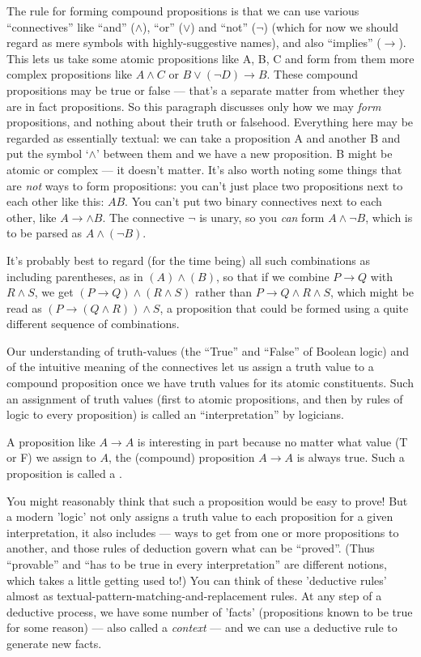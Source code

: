 The rule for forming compound propositions is that we can use various ``connectives'' like ``and'' ($\wedge$), ``or'' ($\vee$) and ``not'' ($\neg$) (which for now we should regard as mere symbols with highly-suggestive names), and also ``implies'' ($\to$). This lets us take some atomic propositions like A, B, C and form from them more complex propositions like $A \wedge C$ or $B\vee (\neg D) \to B$. These compound propositions may be true or false --- that's a separate matter from whether they are in fact propositions. So this paragraph discusses only how we may \textit{form} propositions, and nothing about their truth or falsehood. Everything here may be regarded as essentially textual: we can take a proposition A and another B and put the symbol `$\wedge$' between them and we have a new proposition. B might be atomic or complex --- it doesn't matter. It's also worth noting some things that are \textit{not} ways to form propositions: you can't just place two propositions next to each other like this: $AB$. You can't put two binary connectives next to each other, like $A \to \wedge B$. The connective $\neg$ is unary, so you \textit{can} form $A \wedge \neg B$, which is to be parsed as $A \wedge (\neg B)$.

It's probably best to regard (for the time being) all such combinations as including parentheses, as in $(A) \wedge (B)$, so that if we combine $P \to Q$ with $R  \wedge S$, we get $(P \to Q) \wedge (R  \wedge S)$ rather than $P \to Q  \wedge R \wedge S$, which might be read as $(P  \to (Q  \wedge R)) \wedge S$, a proposition that could be formed using a quite different sequence of combinations.  

Our understanding of truth-values (the ``True'' and ``False'' of Boolean logic) and of the intuitive meaning of the connectives let us assign a truth value to a compound proposition once we have truth values for its atomic constituents. Such an assignment of truth values (first to atomic propositions, and then by rules of logic to every proposition) is called an ``interpretation'' by logicians. 

A proposition like $A \to A$ is interesting in part because no matter what value (T or F) we assign to $A$, the (compound) proposition $A \to A$ is always true. Such a proposition is called a .

You might reasonably think that such a proposition would be easy to prove! But a modern 'logic' not only assigns a truth value to each proposition for a given interpretation, it also includes  --- ways to get from one or more propositions to another, and those rules of deduction govern what can be ``proved''. 
(Thus ``provable'' and ``has to be true in every interpretation'' are different notions, which takes a little getting used to!)  You can think of these 'deductive rules' almost as textual-pattern-matching-and-replacement rules. At any step of a deductive process, we have some number of 'facts' (propositions known to be true for some reason) --- also called a \textit{context} --- and we can use a deductive rule to generate new facts. 


